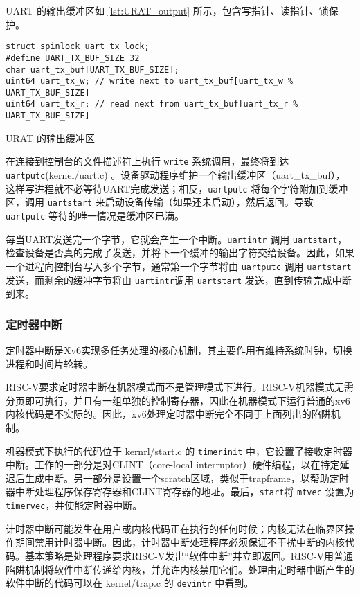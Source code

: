 UART 的输出缓冲区如 \cref{lst:URAT_output} 所示，包含写指针、读指针、锁保护。

\begin{listing}[!htb]
	\begin{verbatim}
struct spinlock uart_tx_lock;
#define UART_TX_BUF_SIZE 32
char uart_tx_buf[UART_TX_BUF_SIZE];
uint64 uart_tx_w; // write next to uart_tx_buf[uart_tx_w % UART_TX_BUF_SIZE]
uint64 uart_tx_r; // read next from uart_tx_buf[uart_tx_r % UART_TX_BUF_SIZE]
	\end{verbatim}
	\caption{URAT 的输出缓冲区}\label{lst:URAT_output}
\end{listing}

在连接到控制台的文件描述符上执行 \texttt{write} 系统调用，最终将到达 \texttt{uartputc}(kernel/uart.c) 。设备驱动程序维护一个输出缓冲区（uart\_tx\_buf），这样写进程就不必等待UART完成发送；相反，\texttt{uartputc} 将每个字符附加到缓冲区，调用 \texttt{uartstart} 来启动设备传输（如果还未启动），然后返回。导致 \texttt{uartputc} 等待的唯一情况是缓冲区已满。

每当UART发送完一个字节，它就会产生一个中断。\texttt{uartintr} 调用 \texttt{uartstart}，检查设备是否真的完成了发送，并将下一个缓冲的输出字符交给设备。因此，如果一个进程向控制台写入多个字节，通常第一个字节将由 \texttt{uartputc} 调用 \texttt{uartstart} 发送，而剩余的缓冲字节将由 \texttt{uartintr}调用 \texttt{uartstart} 发送，直到传输完成中断到来。

\subsubsection{定时器中断}

定时器中断是Xv6实现多任务处理的核心机制，其主要作用有维持系统时钟，切换进程和时间片轮转。

RISC-V要求定时器中断在机器模式而不是管理模式下进行。RISC-V机器模式无需分页即可执行，并且有一组单独的控制寄存器，因此在机器模式下运行普通的xv6内核代码是不实际的。因此，xv6处理定时器中断完全不同于上面列出的陷阱机制。

机器模式下执行的代码位于 kernrl/start.c 的 \texttt{timerinit} 中，它设置了接收定时器中断。工作的一部分是对CLINT（core-local interruptor）硬件编程，以在特定延迟后生成中断。另一部分是设置一个scratch区域，类似于trapframe，以帮助定时器中断处理程序保存寄存器和CLINT寄存器的地址。最后，\texttt{start}将 \texttt{mtvec} 设置为 \texttt{timervec}，并使能定时器中断。

计时器中断可能发生在用户或内核代码正在执行的任何时候；内核无法在临界区操作期间禁用计时器中断。因此，计时器中断处理程序必须保证不干扰中断的内核代码。基本策略是处理程序要求RISC-V发出“软件中断”并立即返回。RISC-V用普通陷阱机制将软件中断传递给内核，并允许内核禁用它们。处理由定时器中断产生的软件中断的代码可以在 kernel/trap.c 的 \texttt{devintr} 中看到。

